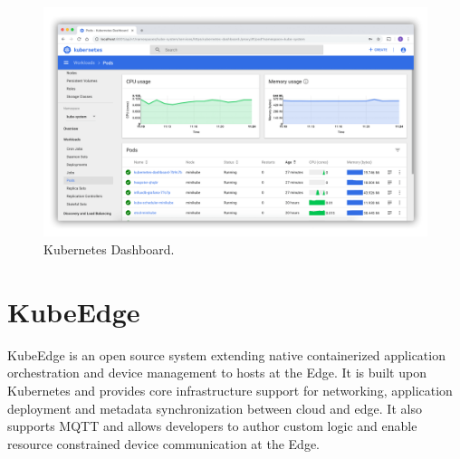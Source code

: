 \begin{figure}[bp]
	\centering
	\includegraphics[width=\textwidth]{images/ui-dashboard.png}
	\caption{Kubernetes Dashboard.}
	\label{fig:ui-dashboard}
\end{figure}



\section{KubeEdge} \label{sec:kubeedgebackground}
KubeEdge is an open source system extending native containerized application orchestration and device management to hosts at the Edge. It is built upon Kubernetes and provides core infrastructure support for networking, application deployment and metadata synchronization between cloud and edge. It also supports MQTT and allows developers to author custom logic and enable resource constrained device communication at the Edge.


